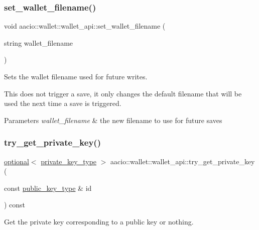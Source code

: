 \subsubsection{\texorpdfstring{set\+\_\+wallet\+\_\+filename()}{set\_wallet\_filename()}}
{\footnotesize\ttfamily void aacio\+::wallet\+::wallet\+\_\+api\+::set\+\_\+wallet\+\_\+filename (\begin{DoxyParamCaption}\item[{string}]{wallet\+\_\+filename }\end{DoxyParamCaption})}

Sets the wallet filename used for future writes.

This does not trigger a save, it only changes the default filename that will be used the next time a save is triggered.


\begin{DoxyParams}{Parameters}
{\em wallet\+\_\+filename} & the new filename to use for future saves \\
\hline
\end{DoxyParams}
\mbox{\label{classaacio_1_1wallet_1_1wallet__api_a96aa8527eb1219e885c8d0371a6ccf1f}} 
\subsubsection{\texorpdfstring{try\+\_\+get\+\_\+private\+\_\+key()}{try\_get\_private\_key()}}
{\footnotesize\ttfamily \mbox{\hyperlink{classaacio_1_1optional}{optional}}$<$ \mbox{\hyperlink{classfc_1_1crypto_1_1private__key}{private\+\_\+key\+\_\+type}} $>$ aacio\+::wallet\+::wallet\+\_\+api\+::try\+\_\+get\+\_\+private\+\_\+key (\begin{DoxyParamCaption}\item[{const \mbox{\hyperlink{classfc_1_1crypto_1_1public__key}{public\+\_\+key\+\_\+type}} \&}]{id }\end{DoxyParamCaption}) const}

Get the private key corresponding to a public key or nothing. \mbox{\label{classaacio_1_1wallet_1_1wallet__api_a80992e6f10f3172bd514d10287a69420}} 
